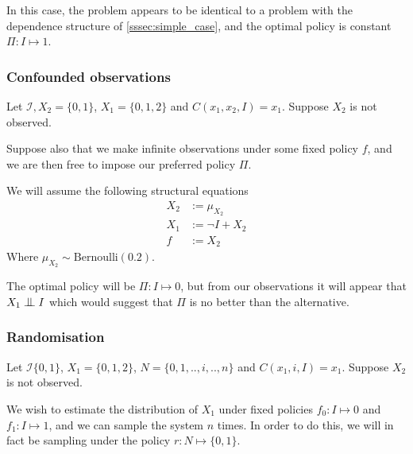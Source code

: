 In this case, the problem appears to be identical to a problem with the dependence structure of \ref{sssec:simple_case}, and the optimal policy is constant $\Pi:I\mapsto 1$.

\subsubsection{Confounded observations}
Let $\mathcal{I},X_2=\{0,1\}$, $X_1=\{0,1,2\}$ and $C(x_1,x_2,I)=x_1$. Suppose $X_2$ is not observed.

Suppose also that we make infinite observations under some fixed policy $f$, and we are then free to impose our preferred policy $\Pi$.

\begin{center}
\end{center}

We will assume the following structural equations
\begin{align*}
    X_2 &:= \mu_{X_2}\\
    X_1 &:= \neg I + X_2 \\
    f   &:= X_2
\end{align*}
Where $\mu_{X_2}\sim \mathrm{Bernoulli}(0.2)$.

The optimal policy will be $\Pi:I\mapsto 0$, but from our observations it will appear that $X_1 \CI I$ which would suggest that $\Pi$ is no better than the alternative.

\subsubsection{Randomisation}
Let $\mathcal{I}\{0,1\}$, $X_1=\{0,1,2\}$, $N=\{0,1,..,i,..,n\}$ and $C(x_1,i,I)=x_1$. Suppose $X_2$ is not observed.

We wish to estimate the distribution of $X_1$ under fixed policies $f_0:I\mapsto 0$ and $f_1:I\mapsto 1$, and we can sample the system $n$ times. In order to do this, we will in fact be sampling under the policy $r:N\mapsto \{0,1\}$.

